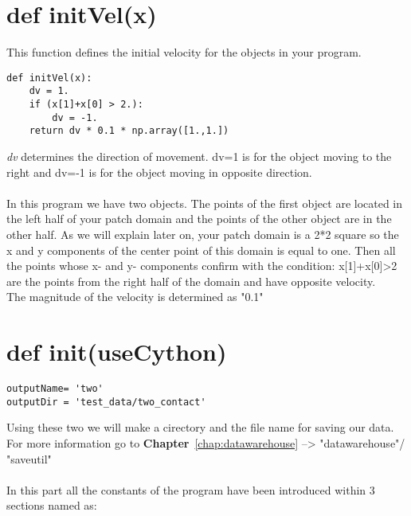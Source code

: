 \section{def initVel(x)}

This function defines the initial velocity for the objects in your program. \\ 

\begin{lstlisting}
def initVel(x):
    dv = 1.
    if (x[1]+x[0] > 2.):
        dv = -1.
    return dv * 0.1 * np.array([1.,1.])
\end{lstlisting}

\emph{dv} determines the direction of movement. dv=1 is for the object moving to the right and dv=-1 is for the object moving in opposite direction. \\ \\
In this program we have two objects. The points of the first object are located in the left half of your patch domain and the points of the other object are in the other half. As we will explain later on, your patch domain is a 2*2 square so the x and y components of the center point of this domain is equal to one. Then all the points whose x- and y- components confirm with the condition: x[1]+x[0]>2 are the points from the right half of the domain and have opposite velocity. 
\\ The magnitude of the velocity is determined as "0.1" 

\section{def init(useCython)}

\begin{lstlisting}
outputName= 'two'
outputDir = 'test_data/two_contact'
\end{lstlisting}

Using these two we will make a cirectory and the file name for saving our data. For more information go to \textbf{Chapter}~\ref{chap:datawarehouse} --> "datawarehouse"/ "saveutil"\\ \\

In this part all the constants of the program have been introduced within 3 sections named as:


